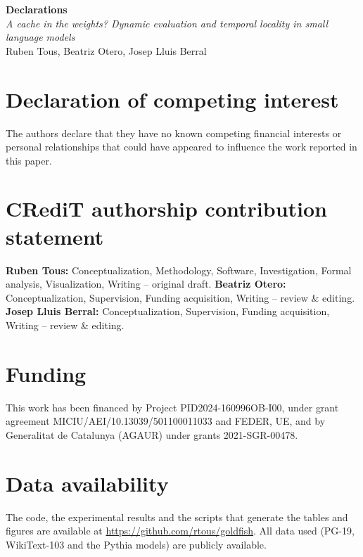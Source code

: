 \documentclass[11pt]{article}
\begin{document}
\begin{center}
{\Large\bfseries Declarations}\\[4pt]
\emph{A cache in the weights? Dynamic evaluation and temporal locality in small language models}\\
Ruben Tous, Beatriz Otero, Josep Lluis Berral
\end{center}

\section*{Declaration of competing interest}
The authors declare that they have no known competing financial interests or personal relationships that could have appeared to influence the work reported in this paper.

\section*{CRediT authorship contribution statement}
\textbf{Ruben Tous:} Conceptualization, Methodology, Software, Investigation, Formal analysis, Visualization, Writing -- original draft.
\textbf{Beatriz Otero:} Conceptualization, Supervision, Funding acquisition, Writing -- review \& editing.
\textbf{Josep Lluis Berral:} Conceptualization, Supervision, Funding acquisition, Writing -- review \& editing.

\section*{Funding}
This work has been financed by Project PID2024-160996OB-I00, under grant agreement MICIU/AEI/10.13039/501100011033 and FEDER, UE, and by Generalitat de Catalunya (AGAUR) under grants 2021-SGR-00478.

\section*{Data availability}
The code, the experimental results and the scripts that generate the tables and figures are available at \url{https://github.com/rtous/goldfish}. All data used (PG-19, WikiText-103 and the Pythia models) are publicly available.
\end{document}
